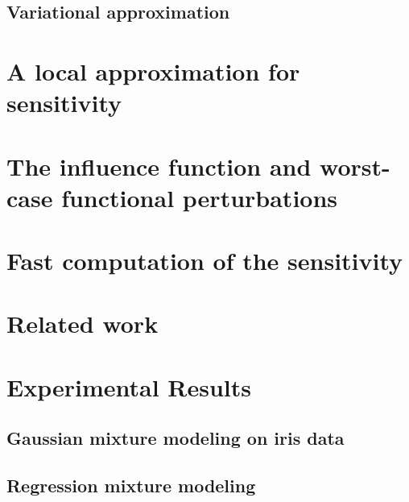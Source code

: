 \documentclass[ba]{imsart}
\begin{document}
    \subsection{Variational approximation}
    


\section{A local approximation for sensitivity}


\section{The influence function and worst-case functional perturbations}


\section{Fast computation of the sensitivity}


\section{Related work}


\section{Experimental Results}


    \subsection{Gaussian mixture modeling on iris data}
    

    \subsection{Regression mixture modeling}
    
\end{document}
